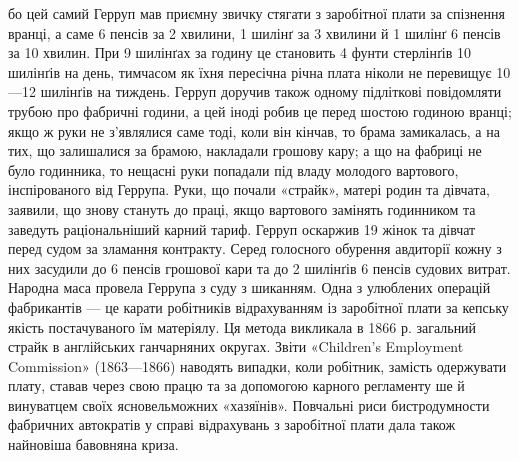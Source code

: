 бо цей самий Герруп мав приємну звичку стягати з заробітної плати за
спізнення вранці, а саме 6 пенсів за 2 хвилини, 1 шилінґ за 3 хвилини й
1 шилінґ 6 пенсів за 10 хвилин. При 9 шилінґах за годину це становить
4 фунти стерлінґів 10 шилінґів на день, тимчасом як їхня пересічна річна
плата ніколи не перевищує 10—12 шилінґів на тиждень. Герруп доручив
також одному підліткові повідомляти трубою про фабричні години,
а цей іноді робив це перед шостою годиною вранці; якщо ж руки не з’являлися
саме тоді, коли він кінчав, то брама замикалась, а на тих, що залишалися
за брамою, накладали грошову кару; а що на фабриці не було
годинника, то нещасні руки попадали під владу молодого вартового,
інспірованого від Геррупа. Руки, що почали «страйк», матері родин
та дівчата, заявили, що знову стануть до праці, якщо вартового замінять
годинником та заведуть раціональніший карний тариф. Герруп
оскаржив 19 жінок та дівчат перед судом за зламання контракту. Серед
голосного обурення авдиторії кожну з них засудили до 6 пенсів грошової
кари та до 2 шилінґів 6 пенсів судових витрат. Народна маса провела
Геррупа з суду з шиканням. Одна з улюблених операцій фабрикантів
— це карати робітників відрахуванням із заробітної плати за
кепську якість постачуваного їм матеріялу. Ця метода викликала в 1866 р.
загальний страйк в англійських ганчарняних округах. Звіти «Children’s
Employment Commission» (1863—1866) наводять випадки, коли робітник,
замість одержувати плату, ставав через свою працю та за допомогою
карного регламенту ше й винуватцем своїх ясновельможних «хазяїнів».
Повчальні риси бистродумности фабричних автократів у справі відрахувань
з заробітної плати дала також найновіша бавовняна криза.
